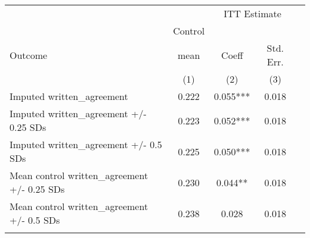 \begin{tabular}{lcccc}
\hline \noalign{\smallskip} &  & \multicolumn{2}{c}{{ ITT Estimate}} & \\
\cline{3-4} & Control &  &  & \\
Outcome & mean & Coeff & Std. Err. & \\
 & (1) & (2) & (3) & \\
\noalign{\smallskip}\hline \noalign{\smallskip}Imputed written\_agreement & 0.222 & 0.055*** & 0.018 & \\
Imputed written\_agreement +/- 0.25 SDs & 0.223 & 0.052*** & 0.018 & \\
Imputed written\_agreement +/- 0.5 SDs & 0.225 & 0.050*** & 0.018 & \\
Mean control written\_agreement +/- 0.25 SDs & 0.230 & 0.044** & 0.018 & \\
Mean control written\_agreement +/- 0.5 SDs & 0.238 & 0.028 & 0.018 & \\
\noalign{\smallskip}\hline\end{tabular}\\
